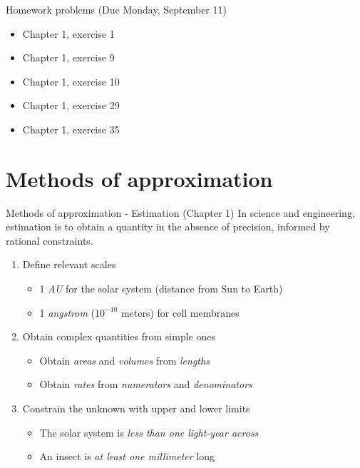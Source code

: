 \documentclass{beamer}
\begin{document}
\begin{frame}{Homework problems (Due Monday, September 11)}
\begin{itemize}
\item Chapter 1, exercise 1
\item Chapter 1, exercise 9
\item Chapter 1, exercise 10
\item Chapter 1, exercise 29
\item Chapter 1, exercise 35
\end{itemize}
\end{frame}

\section{Methods of approximation}

\begin{frame}{Methods of approximation - Estimation (Chapter 1)}
In science and engineering, \alert{estimation} is to obtain a quantity in the absence of precision, informed by rational constraints.
\begin{enumerate}
\item Define relevant \alert{scales}
\begin{itemize}
\item 1 \textit{AU} for the solar system (distance from Sun to Earth)
\item 1 \textit{angstrom} ($10^{-10}$ meters) for cell membranes
\end{itemize}
\item Obtain \alert{complex quantities} from simple ones
\begin{itemize}
\item Obtain \textit{areas} and \textit{volumes} from \textit{lengths}
\item Obtain \textit{rates} from \textit{numerators} and \textit{denominators}
\end{itemize}
\item Constrain the unknown with \alert{upper} and \alert{lower} limits
\begin{itemize}
\item The solar system is \textit{less than one light-year across}
\item An insect is \textit{at least one millimeter} long
\end{itemize}
\end{enumerate}
\end{frame}
\end{document}
